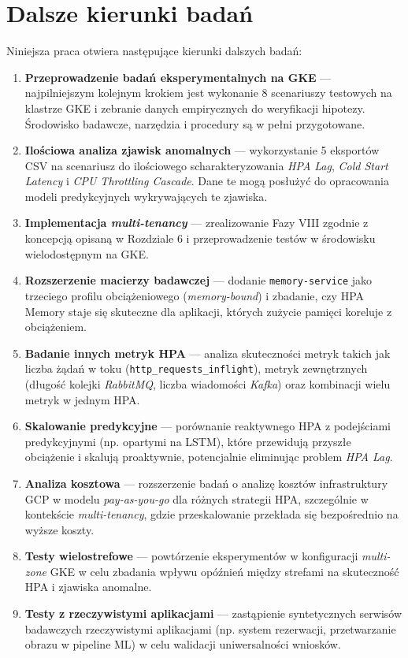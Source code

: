 \section{Dalsze kierunki badań}

Niniejsza praca otwiera następujące kierunki dalszych badań:

\begin{enumerate}
  \item \textbf{Przeprowadzenie badań eksperymentalnych na GKE} — najpilniejszym kolejnym krokiem jest wykonanie 8 scenariuszy testowych na klastrze GKE i zebranie danych empirycznych do weryfikacji hipotezy. Środowisko badawcze, narzędzia i procedury są w pełni przygotowane.

  \item \textbf{Ilościowa analiza zjawisk anomalnych} — wykorzystanie 5 eksportów CSV na scenariusz do ilościowego scharakteryzowania \textit{HPA Lag}, \textit{Cold Start Latency} i \textit{CPU Throttling Cascade}. Dane te mogą posłużyć do opracowania modeli predykcyjnych wykrywających te zjawiska.

  \item \textbf{Implementacja \textit{multi-tenancy}} — zrealizowanie Fazy VIII zgodnie z koncepcją opisaną w Rozdziale 6 i przeprowadzenie testów w środowisku wielodostępnym na GKE.

  \item \textbf{Rozszerzenie macierzy badawczej} — dodanie \texttt{memory-service} jako trzeciego profilu obciążeniowego (\textit{memory-bound}) i zbadanie, czy HPA Memory staje się skuteczne dla aplikacji, których zużycie pamięci koreluje z obciążeniem.

  \item \textbf{Badanie innych metryk HPA} — analiza skuteczności metryk takich jak liczba żądań w toku (\texttt{http\_requests\_inflight}), metryk zewnętrznych (długość kolejki \textit{RabbitMQ}, liczba wiadomości \textit{Kafka}) oraz kombinacji wielu metryk w jednym HPA.

  \item \textbf{Skalowanie predykcyjne} — porównanie reaktywnego HPA z podejściami predykcyjnymi (np. opartymi na LSTM), które przewidują przyszłe obciążenie i skalują proaktywnie, potencjalnie eliminując problem \textit{HPA Lag}.

  \item \textbf{Analiza kosztowa} — rozszerzenie badań o analizę kosztów infrastruktury GCP w modelu \textit{pay-as-you-go} dla różnych strategii HPA, szczególnie w kontekście \textit{multi-tenancy}, gdzie przeskalowanie przekłada się bezpośrednio na wyższe koszty.

  \item \textbf{Testy wielostrefowe} — powtórzenie eksperymentów w konfiguracji \textit{multi-zone} GKE w celu zbadania wpływu opóźnień między strefami na skuteczność HPA i zjawiska anomalne.

  \item \textbf{Testy z rzeczywistymi aplikacjami} — zastąpienie syntetycznych serwisów badawczych rzeczywistymi aplikacjami (np. system rezerwacji, przetwarzanie obrazu w pipeline ML) w celu walidacji uniwersalności wniosków.
\end{enumerate}

